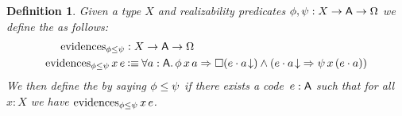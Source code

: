 \documentclass[11pt]{article}
\newtheorem{defn}[thrm]{Definition}
\begin{document}
\begin{defn}\label{defn:tripos-ordering}
  Given a type \(X\) and realizability predicates \(\phi,\psi : {{X}\to{{{\ensuremath{\mathsf{A}}}\to{\Omega}}}}\)
  we define the  as
  follows:
  \begin{align*}
    \IEvidence{\phi}{\psi}
    &: \IRealPred{X}
    \\
    {\IEvidence{\phi}{\psi}\,x\,e}
    &\IsDefined
      \IForall%
      {a:\A}%
      {\IImplies%
      {\phi\,x\,a}%
      {\IAnd%
      {\IBox{(\ITotal{\IAp{e}{a}})}}%
      {(\IImplies{\ITotal{\IAp{e}{a}}}{\psi\,x\,(\IAp{e}{a})})}}}
  \end{align*}
  We then define the 
  by saying \({\phi}\leq{\psi}\) if there exists a code~\(e : \mathsf{A}\)
  such that for all \(x : X\) we have \(\text{evidences}_{{\phi}\leq{\psi}}\,x\,e\).
\end{defn}
\end{document}
